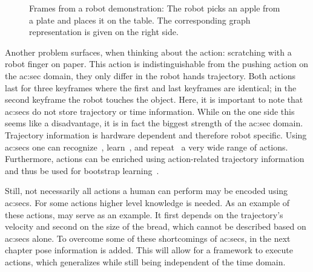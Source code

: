 \begin{figure}[]
\begin{subfigure}[t]{0.475\textwidth}
    \label{fig:sec_examplescenario_pickandplace_5j}
  \end{subfigure}
  \hfil
  \begin{subfigure}[t]{0.475\textwidth}
    \centering
    \label{fig:sec_examplescenario_pickandplace_5t}
  \end{subfigure}%
  \caption{Frames from a robot demonstration: The robot picks an apple from a plate and places it on the table. The corresponding graph representation is given on the right side.}
  \label{fig:sec_examplescenario_pickandplace}
\end{figure}

Another problem surfaces, when thinking about the  action: \ie scratching with a robot finger on paper.
This action is indistinguishable from the pushing action on the \gls{ac:sec} domain, they only differ in the robot hands trajectory.
Both actions last for three keyframes where the first and last keyframes are identical; in the second keyframe the robot touches the object.
Here, it is important to note that \glspl{ac:sec} do not store trajectory or time information.
While on the one side this seems like a disadvantage, it is in fact the biggest strength of the \gls{ac:sec} domain.
Trajectory information is hardware dependent and therefore robot specific.
Using \glspl{ac:sec} one can recognize~\cite{aksoytamosiunaitevuga2013}, learn~\cite{aksoy2011learning, aksoydellentamosiunaite2011}, and repeat~\cite{aksoydellentamosiunaite2011} a very wide range of actions.
Furthermore, actions can be enriched using action-related trajectory information and thus be used for bootstrap learning~\cite{aksoytamosiunaitevuga2013}.

Still, not necessarily all actions a human can perform may be encoded using \glspl{ac:sec}.
For some actions higher level knowledge is needed.
As an example of these actions,  may serve as an example.
It first depends on the trajectory's velocity and second on the size of the bread, which cannot be described based on \glspl{ac:sec} alone.
To overcome some of these shortcomings of \glspl{ac:sec}, in the next chapter pose information is added.
This will allow for a framework to execute actions, which generalizes while still being independent of the time domain.
